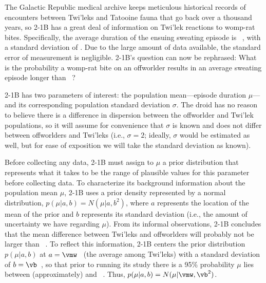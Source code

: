 \FPexp{\pdfinvkernel}{\pdferr}                              %
\FPeval{\vbf}{\vb/(\vbhat * \pdfinvkernel)}                 %
\FPeval{\ibf}{(\vbhat * \pdfinvkernel)/\vb}                 %

The Galactic Republic medical archive keeps meticulous historical records of encounters between Twi'leks and Tatooine fauna that go back over a thousand years, so 2-1B has a great deal of information on Twi'lek reactions to womp-rat bites. Specifically, the average duration of the ensuing sweating episode is \vmw~\units, with a standard deviation of \vsigma. Due to the large amount of data available, the standard error of measurement is negligible. 2-1B's question can now be rephrased: What is the probability a womp-rat bite on an offworlder results in an average sweating episode longer than \vmw~\units?

2-1B has two parameters of interest: the population mean---episode duration $\mu$---and its corresponding population standard deviation $\sigma$. The droid has no reason to believe there is a difference in dispersion between the offworlder and Twi'lek populations, so it will assume for convenience that $\sigma$ is known and does not differ between offworlders and Twi'leks (i.e., $\sigma=2$; ideally, $\sigma$ would be estimated as well, but for ease of exposition we will take the standard deviation as known).

Before collecting any data, 2-1B must assign to $\mu$ a prior distribution that represents what it takes to be the range of plausible values for this parameter before collecting data. To characterize its background information about the population mean $\mu$, 2-1B uses a prior density represented by a normal distribution, $p(\mu|a,b)=N(\mu|a,b^2)$, where $a$ represents the location of the mean of the prior and $b$ represents its standard deviation (i.e., the amount of uncertainty we have regarding $\mu$). From its informal observations, 2-1B concludes that the mean difference between Twi'leks and offworlders will probably not be larger than ~\units. To reflect this information, 2-1B centers the prior distribution $p(\mu|a,b)$ at $a = \vmw$~\units{} (the average among Twi'leks) with a standard deviation of $b = \vb$~\units, so that prior to running its study there is a 95\% probability $\mu$ lies between (approximately) and ~\units. Thus, $p(\mu|a,b) = N(\mu | \vmw, \vb^2)$.

